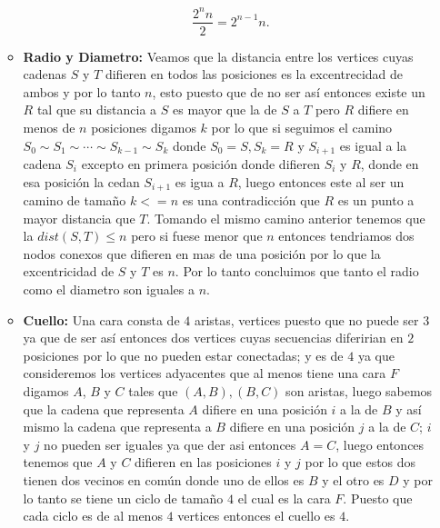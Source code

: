 \documentclass[letterpaper]{article}
\newcommand{\1}{\mathbbm{1}}
\begin{document}
\begin{enumerate}
\begin{itemize}
			\[\frac{2^{n}n}{2} = 2^{n-1}n.\]
			\item \textbf{Radio y Diametro:} Veamos que la distancia entre los vertices cuyas cadenas $S$ y $T$ difieren en todos las posiciones es la excentrecidad de ambos y por lo tanto $n$, esto puesto que de no ser así entonces existe un $R$ tal que su distancia a $S$ es mayor que la de $S$ a $T$ pero $R$ difiere en menos de $n$ posiciones digamos $k$ por lo que si seguimos el camino $S_0\sim S_1 \sim \cdots \sim S_{k-1} \sim S_{k}$ donde $S_0 = S, S_k = R$ y $S_{i+1}$ es igual a la cadena $S_i$ excepto en primera posición donde difieren $S_i$ y $R$, donde en esa posición la cedan $S_{i+1}$ es igua a $R$, luego entonces este al ser un camino de tamaño $k <= n$ es una contradicción que $R$ es un punto a mayor distancia que $T$. Tomando el mismo camino anterior tenemos que la $dist(S,T) \leq n$ pero si fuese menor que $n$ entonces tendriamos dos nodos conexos que difieren en mas de una posición por lo que la excentricidad de $S$ y $T$ es $n$. Por lo tanto concluimos que tanto el radio como el diametro son iguales a $n$.
			\item \textbf{Cuello:} Una cara consta de $4$ aristas, vertices puesto que no puede ser $3$ ya que de ser así entonces dos vertices cuyas secuencias diferirian en $2$ posiciones por lo que no pueden estar conectadas; y es de $4$ ya que consideremos los vertices adyacentes que al menos tiene una cara $F$ digamos $A$, $B$ y $C$ tales que $(A,B),(B,C)$ son aristas, luego sabemos que la cadena que representa $A$ difiere en una posición $i$ a la de $B$ y así mismo la cadena que representa a $B$ difiere en una posición $j$ a la de $C$; $i$ y $j$ no pueden ser iguales ya que der asi entonces $A = C$, luego entonces tenemos que $A$ y $C$ difieren en las posiciones $i$ y $j$ por lo que estos dos tienen dos vecinos en común donde uno de ellos es $B$ y el otro es $D$ y por lo tanto se tiene un ciclo de tamaño $4$ el cual es la cara $F$. Puesto que cada ciclo es de al menos $4$ vertices entonces el cuello es $4$.

\end{itemize}
\end{enumerate}
\end{document}

